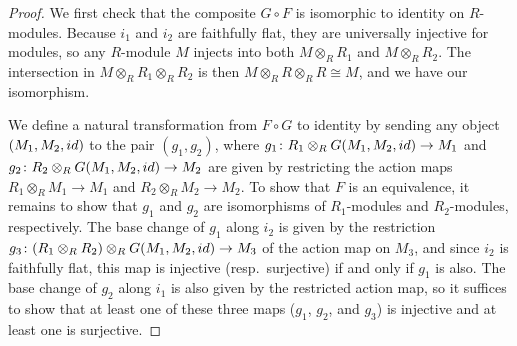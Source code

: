 \documentclass[11pt]{article}
\theoremstyle{definition}
\begin{document}
\begin{proof}
We first check that the composite $G \circ F$ is isomorphic to identity on $R$-modules. Because $i_1$ and $i_2$ are faithfully flat, they are universally injective for modules, so any $R$-module $M$ injects into both $M \otimes_{R} R_1$ and $M \otimes_{R} R_2$. The intersection in $M \otimes_{R} R_1 \otimes_{R} R_2$ is then $M \otimes_{R} R \otimes_{R} R \cong M$, and we have our isomorphism.

We define a natural transformation from $F \circ G$ to identity by sending any object $(M_1, M_2, {\rm id})$ to the pair $(g_1,g_2)$, where $g_1\colon R_1 \otimes_{R} G(M_1,M_2,{\rm id}) \to M_1$ and $g_2\colon R_2 \otimes_{R} G(M_1,M_2,{\rm id}) \to M_2$ are given by restricting the action maps $R_1 \otimes_{R} M_1 \to M_1$ and $R_2 \otimes_{R} M_2 \to M_2$. To show that $F$ is an equivalence, it remains to show that $g_1$ and $g_2$ are isomorphisms of $R_1$-modules and $R_2$-modules, respectively. The base change of $g_1$ along $i_2$ is given by the restriction $g_3\colon (R_1 \otimes_{R} R_2) \otimes_{R} G(M_1,M_2,{\rm id}) \to M_3$ of the action map on $M_3$, and since $i_2$ is faithfully flat, this map is injective (resp.~surjective) if and only if $g_1$ is also. The base change of $g_2$ along $i_1$ is also given by the restricted action map, so it suffices to show that at least one of these three maps ($g_1$, $g_2$, and $g_3$) is injective and at least one is surjective.


\end{proof}
\end{document}
